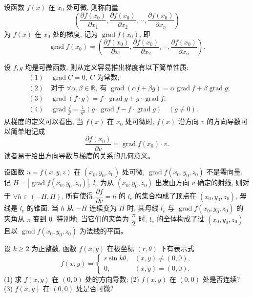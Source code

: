 \documentclass[12pt,fontset=fandol]{ctexart}
\begin{document}
\begin{definition}\label{course-definition-14-1-4}\quad 设函数 $f(x)$ 在 $x_0$ 处可微, 则称向量
\[
  \left(\frac{\partial f(x_0)}{\partial x_1},\frac{\partial f(x_0)}{\partial x_2},\cdots,\frac{\partial f(x_0)}{\partial x_n}\right)
\]
为 $f(x)$ 在 $x_0$ 处的梯度, 记为 $\operatorname{grad}f(x_0)$, 即
\[
  \operatorname{grad}f(x_0)=
  \left(\frac{\partial f(x_0)}{\partial x_1},\frac{\partial f(x_0)}{\partial x_2},\cdots,\frac{\partial f(x_0)}{\partial x_n}\right).
\]

设 $f,g$ 均是可微函数, 则从定义容易推出梯度有以下简单性质:
\[
\begin{aligned}
  &(1)\quad \operatorname{grad}C=0,\ C\text{ 为常数};\\
  &(2)\quad \text{对于 } \forall\alpha,\beta\in\mathbb R,\ \text{有 }
  \operatorname{grad}(\alpha f+\beta g)=\alpha\operatorname{grad}f+\beta\operatorname{grad}g;\\
  &(3)\quad \operatorname{grad}(f\cdot g)=f\cdot\operatorname{grad}g+g\cdot\operatorname{grad}f;\\
  &(4)\quad \operatorname{grad}\frac fg=\frac1{g^2}(g\cdot\operatorname{grad}f-f\cdot\operatorname{grad}g)\quad(g\ne0).
\end{aligned}
\]
从梯度的定义可以看出, 当 $f(x)$ 在 $x_0$ 处可微时, $f(x)$ 沿方向 $v$ 的方向导数可以简单地记成
\[
  \frac{\partial f(x_0)}{\partial v}=\operatorname{grad}f(x_0)\cdot v.
\]
读者易于给出方向导数与梯度的关系的几何意义。

设函数 $u=f(x,y,z)$ 在 $(x_0,y_0,z_0)$ 处可微, $\operatorname{grad}f(x_0,y_0,z_0)$ 不是零向量. 记 $H=|\operatorname{grad}f(x_0,y_0,z_0)|$, $l_v$ 为从 $(x_0,y_0,z_0)$ 出发由方向 $v$ 确定的射线, 则对于 $\forall h\in(-H,H)$, 所有使得 $\dfrac{\partial f}{\partial v}=h$ 的 $l_v$ 的集合构成了顶点在 $(x_0,y_0,z_0)$, 母线是 $l_v$ 的锥面. 当 $h$ 从 $-H$ 连续变为 $H$ 时, 其母线 $l_v$ 与 $\operatorname{grad}f(x_0,y_0,z_0)$ 的夹角从 $\pi$ 变到 $0$. 特别地, 当它们的夹角为 $\dfrac\pi2$ 时, $l_v$ 的全体构成了过 $(x_0,y_0,z_0)$ 且以 $\operatorname{grad}f(x_0,y_0,z_0)$ 为法线的平面。

\end{definition}
\begin{example}\label{course-example-14-1-7}\quad 设 $k\geqslant2$ 为正整数, 函数 $f(x,y)$ 在极坐标 $(r,\theta)$ 下有表示式
\[
  f(x,y)=
  \begin{cases}
    r\sin k\theta, &(x,y)\ne(0,0),\\
    0, &(x,y)=(0,0).
  \end{cases}
\]
(1) 求 $f(x,y)$ 在 $(0,0)$ 处的方向导数; (2) $f(x,y)$ 在 $(0,0)$ 处是否连续? (3) $f(x,y)$ 在 $(0,0)$ 处是否可微?

\end{example}
\end{document}
